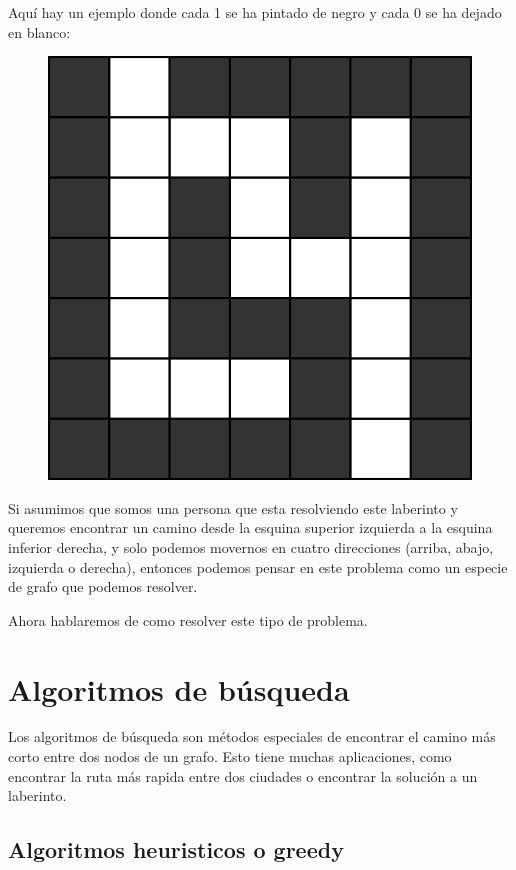 \documentclass{article}
\begin{document}
Aquí hay un ejemplo donde cada 1 se ha pintado de negro y cada 0 se ha dejado en blanco:

\begin{figure}[H]
    \centering
    \includegraphics[width=0.2\paperwidth]{grafo2d}
\end{figure}

Si asumimos que somos una persona que esta resolviendo este laberinto y queremos encontrar un camino desde la esquina superior izquierda a la esquina inferior derecha, y solo podemos movernos en cuatro direcciones (arriba, abajo, izquierda o derecha), entonces podemos pensar en este problema como un especie de grafo que podemos resolver.

Ahora hablaremos de como resolver este tipo de problema.

\section{Algoritmos de búsqueda}

Los algoritmos de búsqueda son métodos especiales de encontrar el camino más corto entre dos nodos de un grafo. Esto tiene muchas aplicaciones, como encontrar la ruta más rapida entre dos ciudades o encontrar la solución a un laberinto.

\subsection{Algoritmos heuristicos o greedy}
\end{document}

